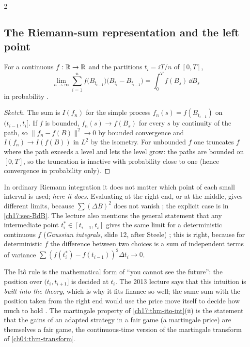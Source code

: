 \begin{paracol}{2}
\subsection{The Riemann-sum representation and the left point}\label{ch17:sec-riemann}
\begin{theorem}\label{ch17:thm-riemann}
For a continuous $f:\mathbb{R}\to\mathbb{R}$ and the partitions $t_i=iT/n$ of $[0,T]$,
\[
  \lim_{n\to\infty}\sum_{i=1}^{n}f\bigl(B_{t_{i-1}}\bigr)\bigl(B_{t_i}-B_{t_{i-1}}\bigr)=\int_0^Tf(B_s)\,\dd B_s
\]
in probability .
\end{theorem}
\begin{proof}[Sketch]
The sum is $I(f_n)$ for the simple process $f_n(s)=f(B_{t_{i-1}})$ on $(t_{i-1},t_i]$. If $f$ is bounded, $f_n(s)\to f(B_s)$ for every $s$ by continuity of the path,
so $\|f_n-f(B)\|^2\to0$ by bounded convergence and $I(f_n)\to I(f(B))$ in $L^2$ by the isometry. For unbounded $f$ one truncates $f$ where the path exceeds a level and lets the level grow:
the paths are bounded on $[0,T]$, so the truncation is inactive with probability close to one (hence convergence in probability only).
\end{proof}
In ordinary Riemann integration it does not matter which point of each small interval is used; \emph{here it does}. Evaluating at
the right end, or at the middle, gives different limits, because $\sum(\Delta B)^2$ does not vanish
; the explicit case is in \cref{ch17:sec-BdB}. The lecture also mentions the general statement that any intermediate point
$t_i^*\in[t_{i-1},t_i]$ gives the same limit for a deterministic continuous $f$ (\emph{Gaussian integrals}, slide 12, after Steele) ;
this is right, because for deterministic $f$ the difference between two choices is a sum of independent terms of variance $\sum(f(t_i^*)-f(t_{i-1}))^2\Delta t_i\to0$.

\begin{finance}
The It\^o rule is the mathematical form of ``you cannot see the future'': the position over $(t_i,t_{i+1}]$ is decided at $t_i$. The
2013 lecture says that this intuition is \emph{built into the theory}, which is why it fits finance so well; the same sum with the position taken from the right end
would use the price move itself to decide how much to hold . The
martingale property of \cref{ch17:thm-ito-int}(ii) is the statement that the gains of an adapted strategy in a fair game (a martingale price)
are themselves a fair game, the continuous-time version of the martingale transform of \cref{ch04:thm-transform}.
\end{finance}


\end{paracol}
